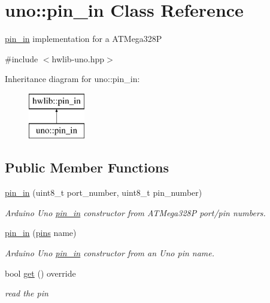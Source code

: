 \hypertarget{classuno_1_1pin__in}{}\section{uno\+:\+:pin\+\_\+in Class Reference}
\label{classuno_1_1pin__in}


\hyperlink{classuno_1_1pin__in}{pin\+\_\+in} implementation for a A\+T\+Mega328P  




{\ttfamily \#include $<$hwlib-\/uno.\+hpp$>$}

Inheritance diagram for uno\+:\+:pin\+\_\+in\+:\begin{figure}[H]
\begin{center}
\leavevmode
\includegraphics[height=2.000000cm]{classuno_1_1pin__in}
\end{center}
\end{figure}
\subsection*{Public Member Functions}
\begin{DoxyCompactItemize}
\item 
\hyperlink{classuno_1_1pin__in_ae30fe3acf850d189ef2cd713b6fd73cf}{pin\+\_\+in} (uint8\+\_\+t port\+\_\+number, uint8\+\_\+t pin\+\_\+number)
\begin{DoxyCompactList}\small\item\em Arduino Uno \hyperlink{classuno_1_1pin__in}{pin\+\_\+in} constructor from A\+T\+Mega328P port/pin numbers. \end{DoxyCompactList}\item 
\hyperlink{classuno_1_1pin__in_a15a9c2466cf7f4576ee8b0674f3c7ec9}{pin\+\_\+in} (\hyperlink{namespaceuno_a0a859f3512bcc3027a090ae07befd5b2}{pins} name)
\begin{DoxyCompactList}\small\item\em Arduino Uno \hyperlink{classuno_1_1pin__in}{pin\+\_\+in} constructor from an Uno pin name. \end{DoxyCompactList}\item 
bool \hyperlink{classuno_1_1pin__in_ae5e5e3db2a5616ea3ba147739ac747ef}{get} () override
\begin{DoxyCompactList}\small\item\em read the pin \end{DoxyCompactList}\end{DoxyCompactItemize}


